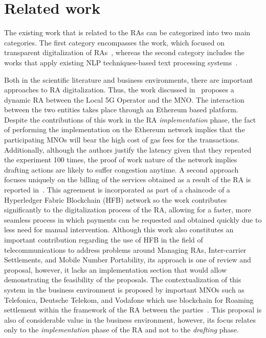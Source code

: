 \section{Related work}\label{sec:related}

The existing work that is related to the RAs can be categorized into two main categories. The first category encompasses the work, which focused on transparent digitalization of RAs~\cite{9369516, 9024541, Huillet2020}, whereas the second category includes the works that apply existing NLP techniques-based text processing systems~\cite{8487847, 9138070, 9104105}.

Both in the scientific literature and business environments, there are important approaches to RA digitalization. Thus, the work discussed in~\cite{9369516} proposes a dynamic RA between the Local 5G Operator and the MNO. The interaction between the two entities takes place through an Ethereum based platform. Despite the contributions of this work in the RA \textit{implementation} phase, the fact of performing the implementation on the Ethereum network implies that the participating MNOs will bear the high cost of gas fees for the transactions. Additionally, although the authors justify the latency given that they repeated the experiment 100 times, the proof of work nature of the network implies drafting actions are likely to suffer congestion anytime. A second approach focuses uniquely on the billing of the services obtained as a result of the RA is reported in~\cite{9024541}. This agreement is incorporated as part of a chaincode of a Hyperledger Fabric Blockchain (HFB) network so the work contributes significantly to the digitalization process of the RA, allowing for a faster, more seamless process in which payments can be requested and obtained quickly due to less need for manual intervention. Although this work also constitutes an important contribution regarding the use of HFB in the field of telecommunications to address problems around Managing RAs, Inter-carrier Settlements, and Mobile Number Portability, its approach is one of review and proposal, however, it lacks an implementation section that would allow demonstrating the feasibility of the proposals. The contextualization of this system in the business environment is proposed by important MNOs such as Telefonica, Deutsche Telekom, and Vodafone which use blockchain for Roaming settlement within the framework of the RA between the parties~\cite{Huillet2020}. This proposal is also of considerable value in the business environment, however, its focus relates only to the \textit{implementation} phase of the RA and not to the \textit{drafting} phase. 

